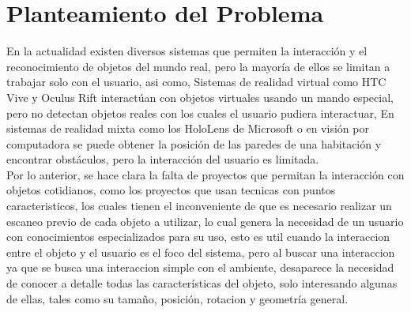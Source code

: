 
\section{Planteamiento del Problema}

    En la actualidad existen diversos sistemas que permiten la interacción y el reconocimiento de objetos del mundo real, pero la mayoría de ellos se limitan a trabajar solo con el usuario, asi como, Sistemas de realidad virtual como HTC Vive \cite{VIVEDis84:online} y Oculus Rift \cite{OculusRi96:online} interactúan con objetos virtuales usando un mando especial, pero no detectan objetos reales con los cuales el usuario pudiera interactuar, En sistemas de realidad mixta como los HoloLens de Microsoft \cite{HoloLens} o en visión por computadora se puede obtener la posición de las paredes de una habitación y encontrar obstáculos, pero la interacción del usuario es limitada.\\
    
    Por lo anterior, se hace clara la falta de proyectos que permitan la interacción con objetos cotidianos, como los proyectos que usan tecnicas con puntos caracteristicos, los cuales tienen el inconveniente de que es necesario realizar un escaneo previo de cada objeto a utilizar, lo cual genera la necesidad de un usuario con conocimientos especializados para su uso, esto es util cuando la interaccion entre el objeto y el usuario es el foco del sistema, pero al buscar una interaccion ya que se busca una interaccion simple con el ambiente, desaparece la necesidad de conocer a detalle todas las características del objeto, solo interesando algunas de ellas, tales como su tamaño, posición, rotacion y geometría general.
     

